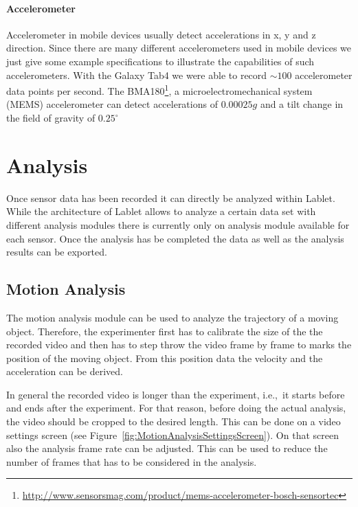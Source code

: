 \documentclass{sigchi}
\newcommand{\ie}{i.e.,\ }
\begin{document}
\paragraph{Accelerometer}
Accelerometer in mobile devices usually detect accelerations in x, y and z direction.
Since there are many different accelerometers used in mobile devices we just give some example specifications to illustrate the capabilities of such accelerometers.
With the Galaxy Tab4 we were able to record $\sim100$ accelerometer data points per second.
The BMA180\footnote{\url{http://www.sensorsmag.com/product/mems-accelerometer-bosch-sensortec}}, a microelectromechanical system (MEMS) accelerometer can detect accelerations of $0.00025g$ and a tilt change in the field of gravity of $0.25^{\circ}$


\section{Analysis}
Once sensor data has been recorded it can directly be analyzed within
Lablet.  While the architecture of Lablet allows to analyze a certain
data set with different analysis modules there is currently only on
analysis module available for each sensor.  Once the analysis has be
completed the data as well as the analysis results can be exported.

\subsection{Motion Analysis}
The motion analysis module can be used to analyze the trajectory of a
moving object.  Therefore, the experimenter first has to calibrate the
size of the the recorded video and then has to step throw the video
frame by frame to marks the position of the moving object.  From this
position data the velocity and the acceleration can be derived.

In general the recorded video is longer than the experiment, \ie it
starts before and ends after the experiment.  For that reason, before
doing the actual analysis, the video should be cropped to the desired
length.  This can be done on a video settings screen (see
Figure~\ref{fig:MotionAnalysisSettingsScreen}).  On that screen also
the analysis frame rate can be adjusted.  This can be used to reduce
the number of frames that has to be considered in the analysis.
\end{document}
